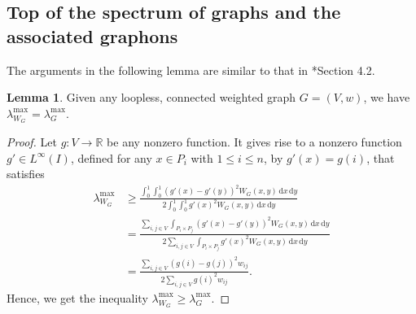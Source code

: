 \documentclass[12pt,a4paper,bold]{thesis}
\theoremstyle{definition}
\newtheorem{lemma}[thm]{Lemma}
\newcommand*{\map}[3]{#1 \colon #2 \to #3}
\begin{document}
\subsection{Top of the spectrum of graphs and the associated graphons}

The arguments in the following lemma are similar to that in 
\cite{Abhishek-Mahan24}*{Section 4.2}.

\begin{lemma} \label{lemma:compare-lambdaG&WG}
    Given any loopless, connected weighted graph $G = (V,w)$, we have
    $\lambda_{W_G}^{\max} = \lambda_G^{\max}$.
\end{lemma}

\begin{proof}
    Let $\map{g}{V}{\mathbb{R}}$ be any nonzero function. It gives rise to 
    a nonzero function $g' \in L^{\infty}(I)$, defined for any $x \in P_i$
    with $1 \leq i \leq n$, by $g'(x) = g(i)$, that satisfies
    \begin{align*}
        \lambda_{W_G}^{\max}
        & \geq 
        \frac{\int_{0}^{1} \int_{0}^{1} (g'(x) - g'(y))^2 W_G(x,y)\, \mathrm{d}x\, \mathrm{d}y}
        {2 \int_{0}^{1} \int_{0}^{1} g'(x)^2 W_G(x,y)\,\mathrm{d}x\, \mathrm{d}y}
        \\
        & =
        \frac{\sum_{i,j \in V} \int_{P_i \times P_j} (g'(x) - g'(y))^2 W_G(x,y)\, 
        \mathrm{d}x\, \mathrm{d}y}{2 \sum_{i,j \in V} \int_{P_i \times P_j}
        g'(x)^2 W_G(x,y)\,\mathrm{d}x\, \mathrm{d}y}
        \\
        & = 
        \frac{\sum_{i,j \in V} (g(i) - g(j))^2 w_{ij}}{2 \sum_{i,j \in V} g(i)^2 w_{ij}}.
    \end{align*}  
    Hence, we get the inequality $\lambda_{W_G}^{\max} \geq \lambda_G^{\max}$.
    

\end{proof}
\end{document}
